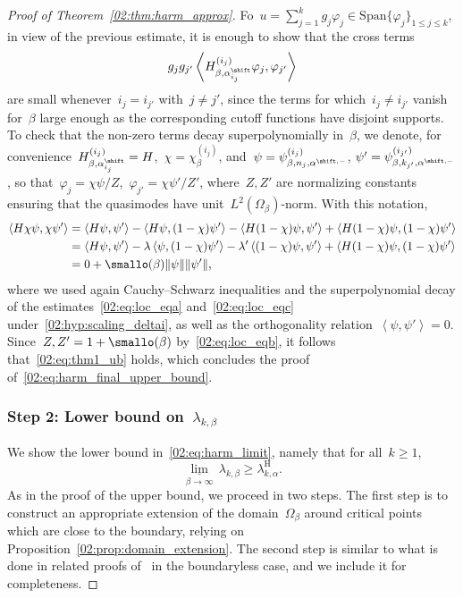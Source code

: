 \begin{proof}[Proof of Theorem~\ref{02:thm:harm_approx}]
        Fo~$u = \sum_{j=1}^k g_j \varphi_j \in \mathrm{Span}\{\varphi_j\}_{1\leq j\leq k}$, in view of the previous estimate, it is enough to show that the cross terms
        \[g_jg_{j'}\left\langle H_{\beta,\alpha_{i_j}^\shift}^{(i_j)}\varphi_j,\varphi_{j'}\right\rangle\]
        are small whenever~$i_j = i_{j'}$ with~$j\neq j'$, since the terms for which~$i_j \neq i_{j'}$ vanish for~$\beta$ large enough as the corresponding cutoff functions have disjoint supports.
        To check that the non-zero terms decay superpolynomially in~$\beta$, we denote, for convenience~$H_{\beta,\alpha_{i_j}^\shift}^{(i_j)}=H$,~$\chi = \chi_\beta^{(i_j)}$, and~$\psi = \psi^{(i_j)}_{\beta,n_j,\alpha^{\shift,-}}$, $\psi' = \psi^{(i_{j'})}_{\beta,k_{j'},\alpha^{\shift,-}}$, so that~$\varphi_j = \chi \psi/Z$,~$\varphi_{j'} = \chi\psi'/Z'$, where~$Z,Z'$ are normalizing constants ensuring that the quasimodes have unit~$L^2(\Omega_\beta)$-norm. With this notation,
        \[\begin{aligned}
            \left\langle H\chi\psi,\chi\psi'\right\rangle &= \left\langle H\psi,\psi'\right\rangle - \left\langle H\psi,(1-\chi)\psi'\right\rangle - \left\langle H(1-\chi)\psi,\psi'\right\rangle + \left\langle H(1-\chi)\psi,(1-\chi)\psi'\right\rangle\\
            &= \left\langle H\psi,\psi'\right\rangle - \lambda\left\langle \psi,(1-\chi)\psi'\right\rangle - \lambda'\left\langle (1-\chi)\psi,\psi'\right\rangle + \left\langle H(1-\chi)\psi,(1-\chi)\psi'\right\rangle\\
            &= 0 + \smallo(\beta)\|\psi\|\|\psi'\|,
        \end{aligned}
        \]
        where we used again Cauchy--Schwarz inequalities and the superpolynomial decay of the estimates~\eqref{02:eq:loc_eqa} and~\eqref{02:eq:loc_eqc} under~\eqref{02:hyp:scaling_deltai}, as well as the orthogonality relation~$\left\langle \psi,\psi'\right\rangle = 0$.
        Since~$Z,Z' = 1 +\smallo(\beta)$ by~\eqref{02:eq:loc_eqb}, it follows that~\eqref{02:eq:thm1_ub} holds, which concludes the proof of~\eqref{02:eq:harm_final_upper_bound}.

        \subsubsection{{Step 2: Lower bound on~$\lambda_{k,\beta}$}}
        We show the lower bound in~\eqref{02:eq:harm_limit}, namely that for all~$k\geq 1$,
        \begin{equation}
            \label{02:eq:harm_final_lower_bound}
            \underset{\beta\to\infty}{\underline\lim}\,\lambda_{k,\beta} \geq \lambda_{k,\alpha}^{\mathrm{H}}.
        \end{equation}
        As in the proof of the upper bound, we proceed in two steps.
        The first step is to construct an appropriate extension of the domain~$\Omega_\beta$ around critical points which are close to the boundary, relying on Proposition~\ref{02:prop:domain_extension}.
        The second step is similar to what is done in related proofs of~\cite{S83,CFKS87} in the boundaryless case, and we include it for completeness.
        \medskip


\end{proof}
